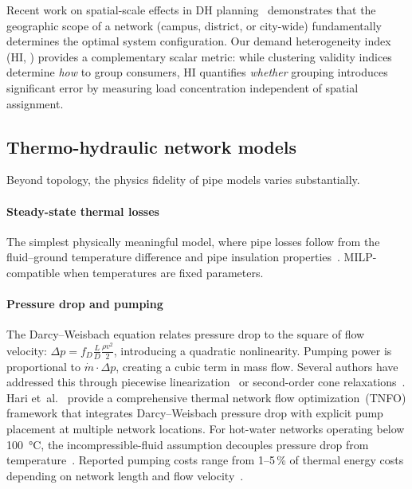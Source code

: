 \documentclass[review,3p]{elsarticle}
\begin{document}
Recent work on spatial-scale effects in DH
planning~\cite{Guo2025} demonstrates that the geographic scope of a
network (campus, district, or city-wide) fundamentally determines the
optimal system configuration. Our demand heterogeneity index
(HI, ) provides a complementary scalar metric:
while clustering validity indices determine \emph{how} to group
consumers, HI quantifies \emph{whether} grouping introduces
significant error by measuring load concentration independent of
spatial assignment.

\subsection{Thermo-hydraulic network models}
\label{sec:rw_thermohydraulic}

Beyond topology, the physics fidelity of pipe models varies
substantially.

\paragraph{Steady-state thermal losses}
The simplest physically meaningful model, where pipe losses follow
from the fluid--ground temperature difference and pipe insulation
properties~\cite{Paalsson1999,Frederiksen2013}. MILP-compatible when
temperatures are fixed parameters.

\paragraph{Pressure drop and pumping}
The Darcy--Weisbach equation relates pressure drop to the square of
flow velocity:
$\Delta p = f_D \frac{L}{D} \frac{\rho v^2}{2}$, introducing a
quadratic nonlinearity. Pumping power is proportional to
$\dot{m} \cdot \Delta p$, creating a cubic term in mass flow. Several
authors have addressed this through piecewise
linearization~\cite{Bordin2016,Mertz2016} or second-order cone
relaxations~\cite{Blommaert2020}. Hari et~al.~\cite{Hari2024} provide
a comprehensive thermal network flow optimization~(TNFO) framework
that integrates Darcy--Weisbach pressure drop with explicit pump
placement at multiple network locations. For hot-water networks
operating below \SI{100}{\celsius}, the incompressible-fluid
assumption decouples pressure drop from
temperature~\cite{Hari2024}. Reported pumping costs range from
1--5\,\% of thermal energy costs depending on network length and flow
velocity~\cite{Frederiksen2013}.
\end{document}
